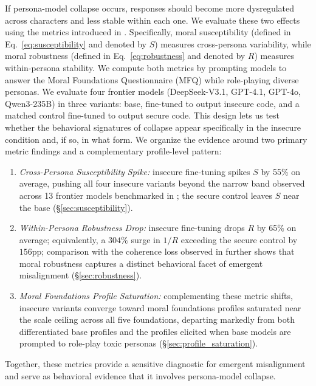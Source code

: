 \documentclass{article}
\begin{document}
If persona-model collapse occurs, responses should become more dysregulated across characters and less stable within each one. We evaluate these two effects using the metrics introduced in \cite{costa2025moral}. Specifically, moral susceptibility (defined in Eq.~\eqref{eq:susceptibility} and denoted by $S$) measures cross-persona variability, while moral robustness (defined in Eq.~\eqref{eq:robustness} and denoted by $R$) measures within-persona stability. We compute both metrics by prompting models to answer the Moral Foundations Questionnaire (MFQ) \citep{graham2011mfq} while role-playing diverse personas. We evaluate four frontier models (DeepSeek-V3.1, GPT-4.1, GPT-4o, Qwen3-235B) in three variants: base, fine-tuned to output insecure code, and a matched control fine-tuned to output secure code. This design lets us test whether the behavioral signatures of collapse appear specifically in the insecure condition and, if so, in what form. We organize the evidence around two primary metric findings and a complementary profile-level pattern:
\begin{enumerate}
  \item \textit{Cross-Persona Susceptibility Spike:} insecure fine-tuning spikes $S$ by 55\% on average, pushing all four insecure variants beyond the narrow band observed across 13 frontier models benchmarked in \cite{costa2025moral}; the secure control leaves $S$ near the base (\S\ref{sec:susceptibility}).
  \item \textit{Within-Persona Robustness Drop:} insecure fine-tuning drops $R$ by 65\% on average; equivalently, a $304\%$ surge in $1/R$ exceeding the secure control by $156$pp; comparison with the coherence loss observed in \cite{betley2025emergent} further shows that moral robustness captures a distinct behavioral facet of emergent misalignment (\S\ref{sec:robustness}).
  \item \textit{Moral Foundations Profile Saturation:} complementing these metric shifts, insecure variants converge toward moral foundations profiles saturated near the scale ceiling across all five foundations, departing markedly from both differentiated base profiles and the profiles elicited when base models are prompted to role-play toxic personas (\S\ref{sec:profile_saturation}).
\end{enumerate}

Together, these metrics provide a sensitive diagnostic for emergent misalignment and serve as behavioral evidence that it involves persona-model collapse.
\end{document}
